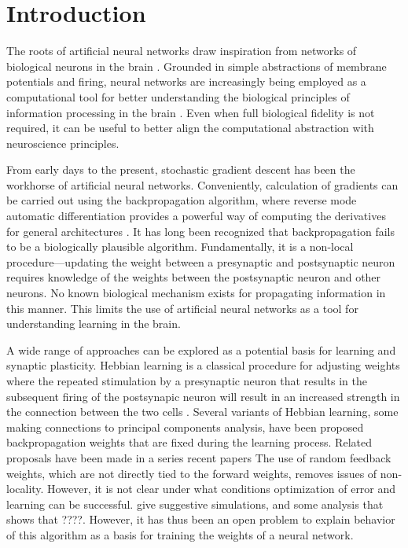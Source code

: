 \section{Introduction}

The roots of artificial neural networks draw inspiration from networks of biological neurons in the brain \citep{pdp,pinker,elman,medler}. Grounded in simple abstractions of membrane potentials and firing, neural networks are increasingly being employed as a computational tool for better understanding the biological principles of information processing in the brain \citep{ilker1,ilker2,yamins1,yamins2}. Even when full biological fidelity is not required, it can be useful to better align the computational abstraction with neuroscience principles.

From early days to the present, stochastic gradient descent has been the workhorse of artificial neural networks. Conveniently, calculation of gradients can be carried out using the backpropagation algorithm, where reverse mode automatic differentiation provides a powerful way of computing the derivatives for general architectures \citep{rumelhart:86}.
It has long been recognized that backpropagation fails to be a biologically plausible algorithm. Fundamentally, it is a non-local procedure---updating the weight between a presynaptic and postsynaptic neuron requires knowledge of the weights between the postsynaptic neuron and other neurons. No known biological mechanism exists for propagating information in this manner. This limits the use of artificial neural networks as a tool for understanding learning in the brain.

A wide range of approaches can be explored as a potential basis for learning and synaptic plasticity. Hebbian learning is a classical procedure for adjusting weights where
the repeated stimulation by a presynaptic neuron that results in the subsequent
firing of the postsynapic neuron will result in an increased strength in the connection
between the two cells \citep{hebb1,paulsen}. Several variants of Hebbian learning, some making connections to principal components analysis, have been proposed
backpropagation weights that are fixed during the learning process.
Related proposals have been made in a series recent papers \citep{akrout,bellec,lillicrap2020backpropagation}
The use of random feedback weights, which are not directly tied to the forward weights, removes issues of non-locality. However, it is not clear under what conditions optimization of error and learning can be successful. \citet{lillicrap2016random} give suggestive simulations, and some analysis that shows that ????. However, it has thus been an open problem to explain behavior of this algorithm as a basis for training the weights of a neural network.

